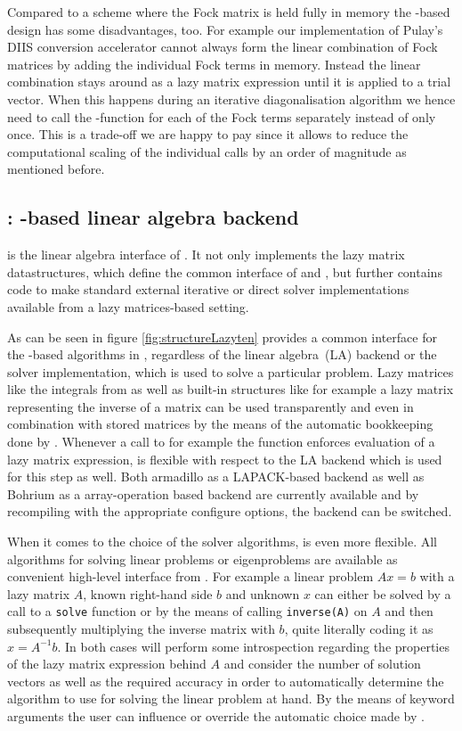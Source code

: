 Compared to a scheme where the Fock matrix is held fully in memory
the \contraction-based design has some disadvantages, too.
For example our implementation of Pulay's DIIS conversion accelerator
cannot always form the linear combination of Fock matrices by adding the
individual Fock terms in memory.
Instead the linear combination stays around as a lazy matrix expression
until it is applied to a trial vector.
When this happens during an iterative diagonalisation algorithm
we hence need to call the \contraction-function for each of the
Fock terms separately instead of only once.
This is a trade-off we are happy to pay since it allows to
reduce the computational scaling of the individual \contraction
calls by an order of magnitude as mentioned before.

%
%
\subsection{\lazyten: \contraction-based linear algebra backend}

\lazyten is the linear algebra interface of \molsturm.
It not only implements the lazy matrix datastructures,
which define the common interface of \gint and \gscf,
but further contains code to make standard external
iterative or direct solver implementations available
from a lazy matrices-based setting.

As can be seen in figure \ref{fig:structureLazyten} \lazyten provides
a common interface for the \contraction-based algorithms in \gscf,
regardless of the linear algebra~(LA) backend or the solver implementation,
which is used to solve a particular problem.
Lazy matrices like the integrals from \gint as well as built-in structures
like for example a lazy matrix representing the inverse of a matrix
can be used transparently and even in combination with stored matrices
by the means of the automatic bookkeeping done by \lazyten.
Whenever a call to for example the \contraction function enforces
evaluation of a lazy matrix expression,
\lazyten is flexible with respect to the LA backend which is used for
this step as well.
Both armadillo as a LAPACK-based backend as well as Bohrium as a array-operation based backend
are currently available and by recompiling \molsturm with the appropriate configure options,
the backend can be switched.

When it comes to the choice of the solver algorithms, \lazyten is even more flexible.
All algorithms for solving linear problems or eigenproblems are available as 
convenient high-level interface from \gscf.
For example a linear problem $A x = b$ with a lazy matrix $A$, known right-hand side $b$
and unknown $x$ can either be solved by a call to a \texttt{solve} function or by
the means of calling \texttt{inverse(A)} on $A$ and then subsequently
multiplying the inverse matrix with $b$, quite literally coding it as $x = A^{-1} b$.
In both cases \lazyten will perform some introspection regarding the properties of
the lazy matrix expression behind $A$ and consider the number of solution
vectors as well as the required accuracy in order to automatically determine the algorithm to use
for solving the linear problem at hand.
By the means of keyword arguments the user can influence or override the automatic
choice made by \lazyten.

